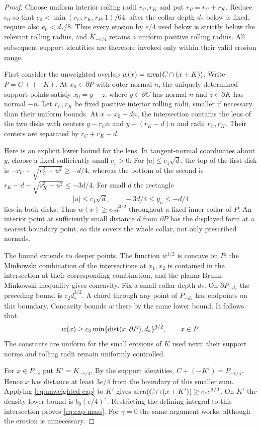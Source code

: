 \begin{proof}
Choose uniform interior rolling radii $r_C,r_K$ and put $r_P=r_C+r_K$.
Reduce $e_0$ so that $e_0<\min(r_C,r_K,r_P,1)/64$; after the
collar depth $d_*$ below is fixed, require also $e_0<d_*/8$.
Thus every erosion by $e/4$ used below is strictly below the relevant
rolling radius, and $K_{-e/4}$ retains a uniform positive rolling radius.
All subsequent support identities are therefore invoked only within their
valid erosion range.

First consider the unweighted overlap
$w(x)=\operatorname{area}(C\cap(x+K))$. Write $P=C+(-K)$.
At $x_0\in\partial P$ with outer normal $n$, the uniquely determined
support points satisfy $x_0=y-z$, where $y\in\partial C$ has normal
$n$ and $z\in\partial K$ has normal $-n$. Let $r_C,r_K$ be fixed
positive interior rolling radii, smaller if necessary than their
uniform bounds. At $x=x_0-dn$, the intersection contains the lens of
the two disks with centers $y-r_Cn$ and $y+(r_K-d)n$ and radii
$r_C,r_K$. Their centers are separated by $r_C+r_K-d$.

Here is an explicit lower bound for the lens. In tangent-normal
coordinates about $y$, choose a fixed sufficiently small $c_1>0$.
For $|u|\le c_1\sqrt d$, the top of the first disk is
$-r_C+\sqrt{r_C^2-u^2}\ge-d/4$, whereas the bottom of the second is
$r_K-d-\sqrt{r_K^2-u^2}\le-3d/4$. For small $d$ the rectangle
\[
                  |u|\le c_1\sqrt d,\qquad
                         -3d/4\le y_n\le-d/4
\]
lies in both disks. Thus $w(x)\ge c_2d^{3/2}$ throughout a fixed
inner collar of $P$. An interior point at sufficiently small distance
$d$ from $\partial P$ has the displayed form at a nearest boundary
point, so this covers the whole collar, not only prescribed normals.

The bound extends to deeper points. The function $w^{1/2}$ is concave
on $P$: the Minkowski combination of the intersections at $x_1,x_2$
is contained in the intersection at their corresponding combination,
and the planar Brunn--Minkowski inequality gives concavity. Fix a small
collar depth $d_*$. On $\partial P_{-d_*}$ the preceding bound is
$c_2d_*^{3/2}$. A chord through any point of $P_{-d_*}$ has endpoints
on this boundary. Concavity bounds $w$ there by the same lower bound.
It follows that
\begin{equation}\label{eq:unweighted-cap}
 w(x)\ge c_3\min\{\operatorname{dist}(x,\partial P),d_*\}^{3/2},\qquad x\in P.
\end{equation}
The constants are uniform for the small erosions of $K$ used next:
their support norms and rolling radii remain uniformly controlled.

For $x\in P_{-e}$ put $K'=K_{-e/4}$. By the support identities,
$C+(-K')=P_{-e/4}$. Hence $x$ has distance at least $3e/4$ from
the boundary of this smaller sum. Applying \eqref{eq:unweighted-cap}
to $K'$ gives
$\operatorname{area}(C\cap(x+K'))\ge c_4e^{3/2}$. On $K'$ the density lower
bound is $b_0(e/4)^\gamma$. Restricting the defining integral to
this intersection proves \eqref{eq:cap-mass}. For $\gamma=0$ the
same argument works, although the erosion is unnecessary.
\end{proof}


